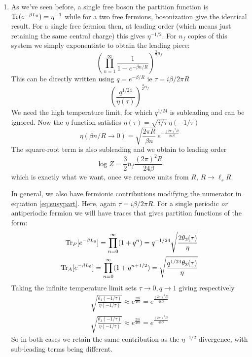 \documentclass[11pt, class=article, crop=false]{standalone}
\begin{document}
\begin{enumerate}
	\item
	As we've seen before, a single free boson the partition function is $\mathrm{Tr}(e^{-\beta L_0}) = \eta^{-1}$ while for a two free fermions, bosonization give the identical result. For a single free fermion then, at leading order (which means just retaining the same central charge) this gives $\eta^{-1/2}$. For $n_f$ copies of this system we simply exponentiate to obtain the leading piece:
	\begin{equation}\label{eq:susypart}
		\left(\prod_{n=1}^\infty \frac{1}{1-e^{-\beta n/R}} \right)^{\frac32 n_f}
	\end{equation}
	This can be directly written using $q = e^{-\beta/ R}$ ie $\tau = i \beta /2 \pi R$
	\[
		\left(\frac{q^{1/{24}}}{\eta(\tau)}\right)^{\frac32 n_f}
	\]
	We need the high temperature limit, for which $q^{1/24}$ is subleading and can be ignored. 
	Now the $\eta$ function satisfies $\eta(\tau) = \sqrt{i/\tau} \, \eta(-1/\tau)$ 
	\[
		\eta(\beta n/R \to 0) = \sqrt{\frac{2 \pi R}{\beta n}}\, e^{-\frac{(2 \pi)^2 R}{24 \beta}}
	\]
	The square-root term is also subleading and we obtain to leading order
	\[
		\log Z = \frac32 n_f \frac{(2\pi)^2 R}{24 \beta}
	\]
	which is exactly what we want, once we remove units from $R$, $R \to \ell_s R$.
	
	In general, we also have fermionic contributions modifying the numerator in equation \eqref{eq:susypart}. Here, again $\tau = i \beta / 2 \pi R$. For a single periodic \emph{or} antiperiodic fermion we will have traces that gives partition functions of the form:
	\[
	\begin{aligned}
		\mathrm{Tr}_{P} [e^{-\beta L_0}]  = \prod_{n = 0}^\infty (1 + q^{n})  = q^{-1/24}\sqrt{\frac{2 \theta_{2}(\tau)}{\eta}}\\
		\mathrm{Tr}_{A} [e^{-\beta L_0}]  = \prod_{n = 0}^\infty (1 + q^{n+1/2})  = \sqrt{\frac{q^{1/24} \theta_{3}(\tau)}{\eta}}
	\end{aligned}
	\]
	Taking the infinite temperature limit sets $\tau \to 0, q \to 1$ giving respectively
	\[
		\begin{aligned}
			\sqrt{ \frac{\theta_4 (-1/\tau)}{\eta(-1/\tau)}} \approx e^{\frac{2 \pi i}{48 \tau}} = e^{\frac{(2 \pi)^2 R}{48 \beta}}\\
			\sqrt{ \frac{\theta_3 (-1/\tau)}{\eta(-1/\tau)}} \approx e^{\frac{2 \pi i}{48 \tau}} = e^{\frac{(2 \pi)^2 R}{48 \beta}}
		\end{aligned}
	\]
	So in both cases we retain the same contribution as the $\eta^{-1/2}$ divergence, with sub-leading terms being different. 
	
	
	
\end{enumerate}
\end{document}
